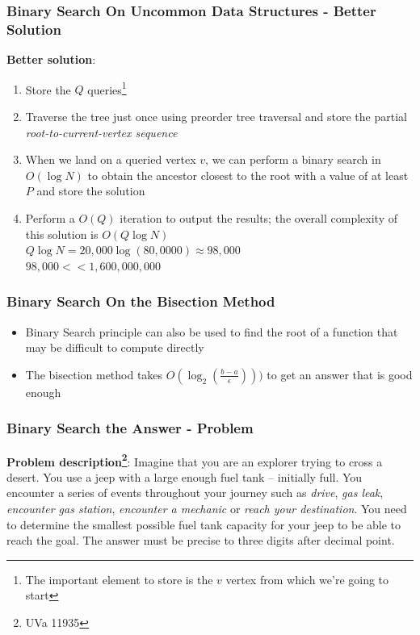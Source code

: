 \documentclass{beamer}
\begin{document}
\begin{frame}[fragile]
\frametitle{Binary Search On Uncommon Data Structures - Better Solution}

\textbf{Better solution}: 

\begin{enumerate}
    \item Store the $Q$ queries\footnote{The important element to store is the $v$ vertex from which we're going to start}
    \item Traverse the tree just once using preorder tree traversal and store the partial \textit{root-to-current-vertex sequence}
    \item When we land on a queried vertex $v$, we can perform a binary search in $O(\log N)$ to obtain the ancestor closest to the root with a value of at least $P$ and store the solution
    \item Perform a $O(Q)$ iteration to output the results; the overall complexity of this solution is $O(Q\log N)$ \\ \vspace{0.3cm}
    \color{blue}$Q\log N = 20,000 \log(80,0000) \approx 98,000$ \\ $98,000 << 1,600,000,000$\color{black}
\end{enumerate}

\end{frame}

\begin{frame}[fragile]
\frametitle{Binary Search On the Bisection Method}

\begin{itemize}
    \item Binary Search principle can also be used to find the root of a function that may be difficult to compute directly
    \item The bisection method takes $O(\log_2(\frac{b-a}{\epsilon})))$ to get an answer that is good enough
\end{itemize}

\end{frame}

\begin{frame}[fragile]
\frametitle{Binary Search the Answer - Problem}

\textbf{Problem description\footnote{UVa 11935}}: Imagine that you are an explorer trying to cross a desert. You use a jeep with a large enough fuel tank – initially full. You encounter a series of events throughout your journey such as \textit{drive}, \textit{gas leak}, \textit{encounter gas station}, \textit{encounter a mechanic} or \textit{reach your destination}. You need to determine the smallest possible fuel tank capacity for your jeep to be able to reach the goal. The answer must be precise to three digits after decimal point.

\end{frame}
\end{document}
